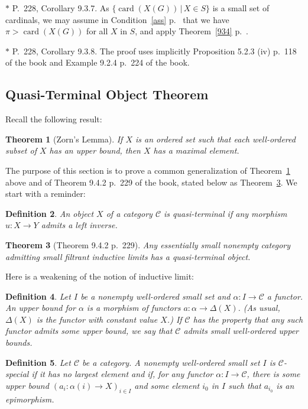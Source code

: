 \documentclass[12pt]{article}%
\newtheorem{thm}{Theorem}%
\newtheorem{df}[thm]{Definition}%
\theoremstyle{remark}
\theoremstyle{definition}
\newcommand{\nn}{\noindent}
\newcommand{\C}{\mathcal C}
\DeclareMathOperator{\card}{card}%
\begin{document}
\nn$*$ P.~228, Corollary 9.3.7. As $\{\card(X(G))\,|\,X\in S\}$ is a small set of cardinals, we may assume in Condition~\ref{ass} p.~\pageref{ass} that we have $\pi>\card(X(G))$ for all $X$ in $S$, and apply Theorem~\ref{934} p.~\pageref{934}. 

\nn$*$ P.~228, Corollary 9.3.8. The proof uses implicitly Proposition 5.2.3 (iv) p.~118 of the book and Example 9.2.4 p.~224 of the book. 


\subsection{Quasi-Terminal Object Theorem }

Recall the following result:

\begin{thm}[Zorn's Lemma]\label{zorn}
If $X$ is an ordered set such that each well-ordered subset of $X$ has an upper bound, then $X$ has a maximal element.
\end{thm}

The purpose of this section is to prove a common generalization of Theorem~\ref{zorn} above and of Theorem 9.4.2 p.~229 of the book, stated below as Theorem~\ref{942}. We start with a reminder:

\begin{df}
An object $X$ of a category $\C$ is {\em quasi-terminal} if any morphism $u:X\to Y$ admits a left inverse.
\end{df}

\begin{thm}[Theorem 9.4.2 p.~229]\label{942}
Any essentially small nonempty category admitting small filtrant inductive limits has a quasi-terminal object.
\end{thm}

Here is a weakening of the notion of inductive limit:

\begin{df}
Let $I$ be a nonempty well-ordered small set and $\alpha:I\to\C$ a functor. An {\em upper bound} for $\alpha$ is a morphism of functors $a:\alpha\to\Delta(X)$. (As usual, $\Delta(X)$ is the functor with constant value $X$.) If $\C$ has the property that any such functor admits some upper bound, we say that $\C$ {\em admits small well-ordered upper bounds}.
\end{df}

\begin{df}
Let $\C$ be a category. A nonempty well-ordered small set $I$ is $\C$-{\em special} if it has no largest element and if, for any functor $\alpha:I\to\C$, there is some upper bound $(a_i:\alpha(i)\to X)_{i\in I}$ and some element $i_0$ in $I$ such that $a_{i_0}$ is an epimorphism. 
\end{df}
\end{document}
